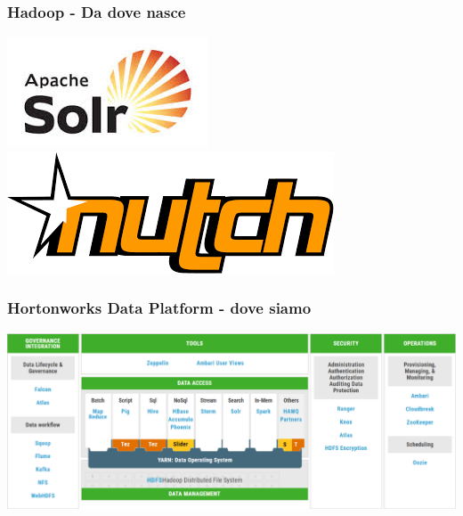\documentclass[10pt,xcolor=dvipsnames,flushleft]{beamer}
\begin{document}
\begin{frame}[t]
\frametitle{Hadoop - Da dove nasce}

\begin{center}
	\includegraphics[scale=0.45]{img/solr-logo}\\
	
	\includegraphics[scale=0.45]{img/nutch-logo}
\end{center}

\end{frame}

\begin{frame}[t]
\frametitle{Hortonworks Data Platform - dove siamo}

\begin{center}
	\includegraphics[scale=0.45]{img/HDP_25}
\end{center}

\end{frame}
\end{document}
